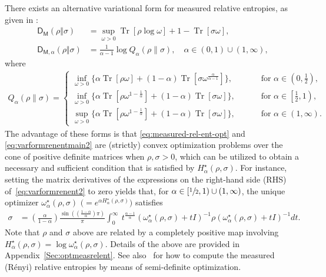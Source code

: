 \documentclass[a4paper,onecolumn,11pt,accepted=2026-05-12]{quantumarticle}
\DeclareMathOperator{\Tr}{Tr}
\newcommand{\sD}{\mathsf{D}}
\begin{document}
 
 There exists an alternative variational form for measured relative entropies, as given in \cite[Lemma~1 and Lemma~2]{Berta2015OnEntropies}:
\begin{align}
\sD_{\mathsf{M}}(\rho\Vert\sigma)&=\sup_{\omega>0} \Tr[\rho\log\omega]+1-\Tr[\sigma\omega],\label{eq:measured-rel-ent-opt} \\
    \sD_{\mathsf{M},\alpha}(\rho\Vert\sigma)&= \frac{1}{\alpha-1} \log Q_{\alpha}(\rho\|\sigma), \quad \alpha \in (0,1) \cup (1,\infty), \label{eq:varformrenentmain2}
\end{align}
where 
\begin{align}\label{eq:varformrenent2}
Q_{\alpha}(\rho\|\sigma)=\begin{cases}
\inf_{\omega>0}\big\{ \alpha\Tr[\rho\omega]+\left(1-\alpha\right)\Tr[\sigma\omega^{\frac{\alpha}{\alpha-1}}]\big\}, & \qquad\text{ for }\alpha  \in\left(0,\frac{1}{2}\right),\\
\inf_{\omega>0}\big\{ \alpha\Tr[\rho\omega^{1-\frac{1}{\alpha}}]+\left(1-\alpha\right)\Tr[\sigma\omega]\big\}, & \qquad\text{ for }\alpha  \in\left[\frac{1}{2},1\right),\\
\sup_{\omega>0}\big\{ \alpha\Tr[\rho\omega^{1-\frac{1}{\alpha}}]+\left(1-\alpha\right)\Tr[\sigma\omega]\big\}, & \qquad\text{ for }\alpha  \in\left(1,\infty\right).
\end{cases}
\end{align}
The advantage of these forms is that \eqref{eq:measured-rel-ent-opt} and \eqref{eq:varformrenentmain2} are (strictly) convex optimization problems  over the cone of positive definite matrices when $\rho,\sigma>0$, which  can be utilized to obtain a necessary and sufficient condition that is satisfied by $H_{\alpha}^{\star}(\rho,\sigma)$.  For instance,
  setting the matrix derivatives of the expressions on the right-hand side (RHS) of~\eqref{eq:varformrenent2}  to zero yields that, for $\alpha \in [\sfrac{1}{2},1) \cup (1,\infty)$, the unique optimizer  $\omega_{\alpha}^{\star}(\rho,\sigma)$ $\big(= e^{\alpha H_{\alpha}^{\star}(\rho,\sigma)}\big)$ satisfies 
 \begin{align}
\sigma & =\left(\frac{\alpha}{1-\alpha}\right)\frac{\sin\!\left(\left(\frac{1-\alpha}{\alpha}\right)\pi\right)}{\pi}\int_{0}^{\infty}\ t^{\frac{\alpha-1}{\alpha}}\left(\omega_{\alpha}^{\star}(\rho,\sigma)+tI\right)^{-1}\rho\left(\omega_{\alpha}^{\star}(\rho,\sigma)+tI\right)^{-1}dt.\label{eq:optimal-omega-alpha-gen}
\end{align}
Note that  $\rho$ and $\sigma$ above  are related by a completely positive map involving $H_{\alpha}^{\star}(\rho,\sigma)=\log \omega_{\alpha}^{\star}(\rho,\sigma)$.
Details of the above  are provided in  Appendix~\ref{Sec:optmeasrelent}. See also~\cite{huang2025semidefiniteoptimizationmeasuredrelative} for how to compute the measured (R\'enyi) relative entropies by means of semi-definite optimization. 
\end{document}
